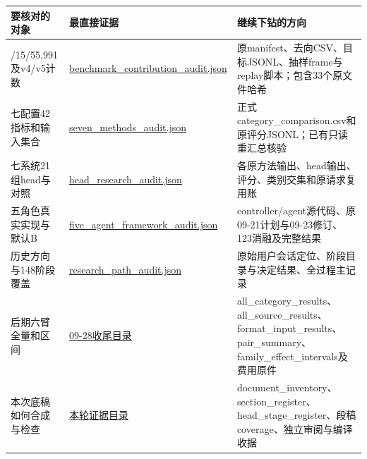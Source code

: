 \documentclass[
  11pt,
  a4paper,
]{article}
\newcounter{none} %
\begin{document}
{\def\LTcaptype{none} %
\begin{longtable}[]{@{}
  >{\raggedright\arraybackslash}p{}
  >{\raggedright\arraybackslash}p{}
  >{\raggedright\arraybackslash}p{}@{}}
\toprule\noalign{}
\begin{minipage}[b]{\linewidth}\raggedright
要核对的对象
\end{minipage} & \begin{minipage}[b]{\linewidth}\raggedright
最直接证据
\end{minipage} & \begin{minipage}[b]{\linewidth}\raggedright
继续下钻的方向
\end{minipage} \\
\midrule\noalign{}
\endhead
\bottomrule\noalign{}
\endlastfoot
26/15/55,991及v4/v5计数 &
\href{https://github.com/xiotakut/cf_mrg/blob/main/papers/2026-10-02_cf_moa/author_dossier/sources/9fc971a0bead_benchmark_contribution_audit.json}{benchmark\_\allowbreak{}contribution\_\allowbreak{}audit.\allowbreak{}json}
&
原manifest、去向CSV、目标JSONL、抽样frame与replay脚本；包含33个原文件哈希 \\
七配置42指标和输入集合 &
\href{https://github.com/xiotakut/cf_mrg/blob/main/papers/2026-10-02_cf_moa/author_dossier/sources/13d3f2643dd3_seven_methods_audit.json}{seven\_\allowbreak{}methods\_\allowbreak{}audit.\allowbreak{}json}
& 正式category\_comparison.csv和原评分JSONL；已有只读重汇总核验 \\
七系统21组head与对照 &
\href{https://github.com/xiotakut/cf_mrg/blob/main/papers/2026-10-02_cf_moa/author_dossier/sources/05945deac18d_head_research_audit.json}{head\_\allowbreak{}research\_\allowbreak{}audit.\allowbreak{}json}
& 各原方法输出、head输出、评分、类别交集和原请求复用账 \\
五角色真实实现与默认B &
\href{https://github.com/xiotakut/cf_mrg/blob/main/papers/2026-10-02_cf_moa/author_dossier/sources/2c8121d3938b_five_agent_framework_audit.json}{five\_\allowbreak{}agent\_\allowbreak{}framework\_\allowbreak{}audit.\allowbreak{}json}
& controller/agent源代码、原09-21计划与09-23修订、123消融及完整结果 \\
历史方向与148阶段覆盖 &
\href{https://github.com/xiotakut/cf_mrg/blob/main/papers/2026-10-02_cf_moa/author_dossier/sources/77369dcb2268_research_path_audit.json}{research\_\allowbreak{}path\_\allowbreak{}audit.\allowbreak{}json}
& 原始用户会话定位、阶段目录与决定结果、全过程主记录 \\
后期六臂全量和区间 &
\href{https://github.com/xiotakut/cf_mrg/blob/main/benchmarks/2026-09-28_cf_moa_transparent_closeout}{09-28收尾目录}
&
all\_category\_results、all\_source\_results、format\_input\_results、pair\_summary、family\_effect\_intervals及费用原件 \\
本次底稿如何合成与检查 &
\href{https://github.com/xiotakut/cf_mrg/blob/main/papers/2026-10-02_cf_moa/author_dossier/evidence}{本轮证据目录}
&
document\_inventory、section\_register、head\_stage\_register、段稿coverage、独立审阅与编译收据 \\
\end{longtable}
}
\end{document}
